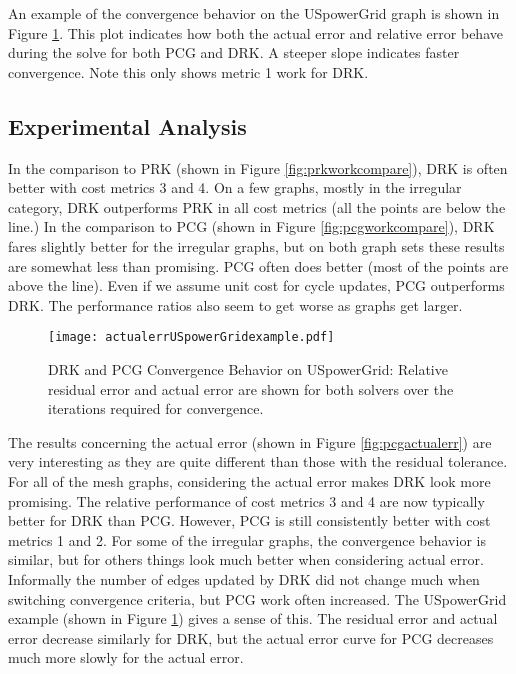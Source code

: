 \documentclass{sig-alternate}
\begin{document}
An example
of the convergence behavior on the USpowerGrid graph is shown
in Figure \ref{fig:actualerrexample}. This plot indicates
how both the actual error and relative error behave during
the solve for both PCG and DRK.
A steeper slope indicates faster convergence.
Note this only shows metric 1 work for DRK.



\subsection{Experimental Analysis}
In the comparison to PRK (shown in Figure \ref{fig:prkworkcompare}),
DRK is often better with cost metrics 3 and 4.
On a few graphs, mostly in the irregular
category, DRK outperforms PRK in all cost metrics
(all the points are below the line.)
In the comparison to PCG (shown in Figure \ref{fig:pcgworkcompare}),
DRK fares slightly better for the irregular graphs,
but on both graph sets
these results are somewhat
less than promising.
PCG often does better (most of the points are above the line).
Even if we assume unit cost for cycle updates, PCG outperforms DRK.
The performance ratios also seem to get worse as graphs get larger.

\begin{figure}[htb!]
\centering
\texttt{[image: actualerrUSpowerGridexample.pdf]}
\caption{DRK and PCG Convergence Behavior on USpowerGrid: Relative
residual error and actual error are shown for both solvers over the iterations
required for convergence.
\label{fig:actualerrexample}}
\end{figure}


The results concerning the actual error
(shown in Figure \ref{fig:pcgactualerr})
are very interesting as
they are quite different than those with the residual tolerance. For all of the
mesh graphs, considering the actual error makes DRK look more promising.
The relative performance of cost metrics 3 and 4 are now typically better for
DRK than PCG. However, PCG is still consistently better with cost metrics
1 and 2.
For some of the irregular
graphs, the convergence behavior is similar,
but for others things look much better
when considering actual error. Informally the number of edges
updated by DRK did
not change much when switching convergence criteria, but PCG work often
increased.
The USpowerGrid example (shown in Figure \ref{fig:actualerrexample})
gives a sense of this. The residual error and actual
error decrease similarly for DRK, but the actual
error curve for PCG decreases much
more slowly for the actual error.
\end{document}
